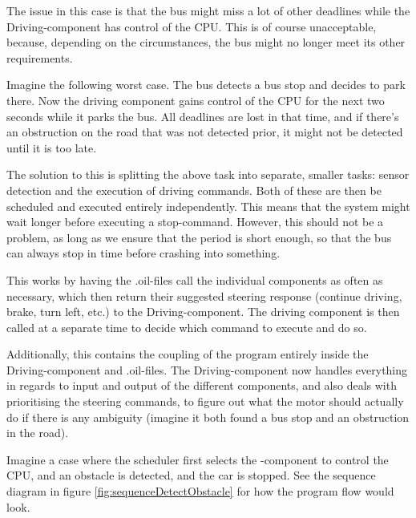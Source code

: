 The issue in this case is that the bus might miss a lot of other deadlines while the Driving-component has control of the CPU. This is of course unacceptable, because, depending on the circumstances, the bus might no longer meet its other requirements. 

Imagine the following worst case. The bus detects a bus stop and decides to park there. Now the driving component gains control of the CPU for the next two seconds while it parks the bus. All deadlines are lost in that time, and if there's an obstruction on the road that was not detected prior, it might not be detected until it is too late.

The solution to this is splitting the above task into separate, smaller tasks: sensor detection and the execution of driving commands. Both of these are then be scheduled and executed entirely independently. This means that the system might wait longer before executing a stop-command. However, this should not be a problem, as long as we ensure that the period is short enough, so that the bus can always stop in time before crashing into something. 

This works by having the .oil-files call the individual components as often as necessary, which then return their suggested steering response (continue driving, brake, turn left, etc.) to the Driving-component. The driving component is then called at a separate time to decide which command to execute and do so.

Additionally, this contains the coupling of the program entirely inside the Driving-component and .oil-files. The Driving-component now handles everything in regards to input and output of the different components, and also deals with prioritising the steering commands, to figure out what the motor should actually do if there is any ambiguity (imagine it both found a bus stop and an obstruction in the road). 

Imagine a case where the scheduler first selects the -component to control the CPU, and an obstacle is detected, and the car is stopped. See the sequence diagram in figure \ref{fig:sequenceDetectObstacle} for how the program flow would look.

